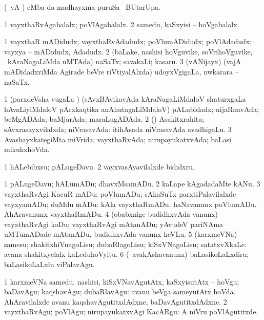 \bentry
{} 
\gl{\kirx}
\expl{}
\bmng
(\pArxparx\ yA \pArxM)  eMba \kirx da madhayxma puruSa \Eva\ BUtarUpa. 
\emng
\eentry

\bentry
{} 
\gl{\gu}
\expl{}
\bmng
\bnum
\num{1} vayxthaRvAgabalalx; poVlAgabalalx. 
\num{2} samedu, kaSxyisi -- hoVgabalalx. 
\enum
\emng
\eentry

\bentry
{} 
\gl{\nA}
\expl{}
\bmng
\bnum
\num{1} vayxthaR mADidudx; vayxthaRvAdadudx; poVlumADidudx; poVlAdadudx; vayxya -- mADidudx, Adadudx. 
\num{2} (baLake, nashisi hoVguvike, soVrihoVguvike, \mo\ kAraNagaLiMda uMTAda) naSaTx; savakaLi; kasaru. 
\num{3} (vANijayx) (vajA mADidadxriMda Agirade beVre riVtiyalAlxda) udoyxVgigaLa, nwkarara -- naSaTx. 
\enum
\emng
\eentry

\bentry
{} 
\gl{\gu}
\expl{}
\bmng
\bnum
\num{1} (parxdeVsha \mo vugaLa \vi) (sAvxBAvikavAda kAraNagaLiMdaloV shaturxgaLa hAvaLiyiMdaloV pArxkaqtika anAhutagaLiMdaloV) pALubidadx; nijaRnavAda; beMgADAda; baMjarAda; maraLugADAda. 
\num{2} (\rUpa) Asakitxrahita; sAvxrasayxvilalxda; niVrasavAda:  itihAsada niVrasavAda avadhigaLu. 
\num{3} AvashayxkategiMta miVrida; vayxthaRvAda; nirupayukatxvAda; baLasi mikukxhoVda. 
\enum
\emng

\noindent
\gl{\pagu}
\expl{}
\bmng
\bnum
\num{1}  hALebibxsu; pALugeDavu. 
\num{2}  vayxvasAyavilalxde bididxru. 
\enum
\emng
\eentry

\bentry
{} 
\gl{\sakirx}
\expl{}
\bmng
\bnum
\num{1} pALugeDavu; hALumADu; dhavxMsamADu. 
\num{2} kaLape kAgadadaMte kANu. 
\num{3} vayxthaRvAgi KacuR mADu; poVlumADu; sAkaSuTx parxtiPalavilalxde vayxyamADu; duMdu mADu:  kAla vayxthaRmADu.  haNavanunx poVlumADu.  AhAravanunx vayxthaRmADu. 
\num{4} (obabxnige budidhxvAda \mo vanunx) vayxthaRvAgi koDu; vayxthaRvAgi mAtanADu; yAvudeV pariNAma uMTumADade mAtanADu, budidhxvAda \mo vanunx heVLu. 
\num{5} (karxmeVNa) samesu; shakitxhiVnagoLisu; dubaRlagoLisu; kiSxVNagoLisu; satatxvXkaLe:  avana shakitxyelalx kaLeduhoVyitu. 
\num{6} (\kanmu\ avakAshavanunx) baLasikoLaLxdiru; baLasikoLaLxlu viPalavAgu. 
\enum
\emng

\noindent 
\gl{\akirx}
\expl{}
\bmng
\bnum
\num{1} karxmeVNa samedu, nashisi, kiSxVNavAgutAtx, kaSxyisutAtx -- hoVgu; baDavAgu; kaqshavAgu; dubaRlavAgu:  avanu beVga sameyutAtx hoVda.  AhAravilalxde avanu kaqshavAgutitxdAdxne, baDavAgutitxdAdxne. 
\num{2} vayxthaRvAgu; poVlAgu; nirupayukatxvAgi KacARgu:  A niVru poVlAgutitxde. 
\enum
\emng

